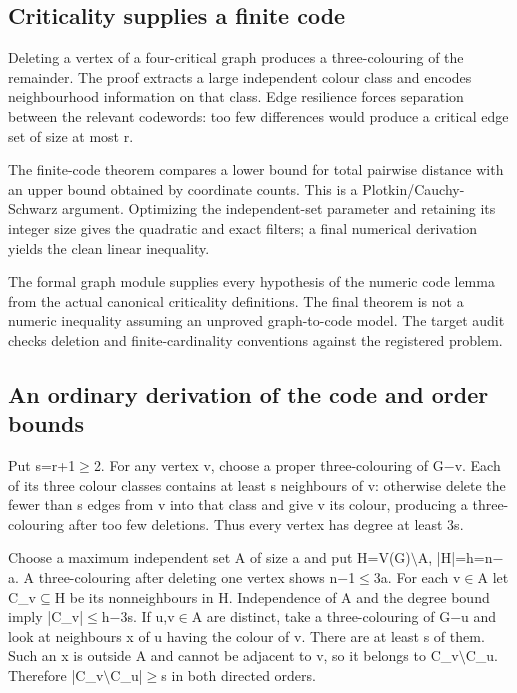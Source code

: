 \documentclass[11pt,a4paper]{article}
\begin{document}
\subsection{Criticality supplies a finite code}
Deleting a vertex of a four-critical graph produces a three-colouring of the remainder. The proof extracts a large independent colour class and encodes neighbourhood information on that class. Edge resilience forces separation between the relevant codewords: too few differences would produce a critical edge set of size at most r.

The finite-code theorem compares a lower bound for total pairwise distance with an upper bound obtained by coordinate counts. This is a Plotkin/Cauchy-Schwarz argument. Optimizing the independent-set parameter and retaining its integer size gives the quadratic and exact filters; a final numerical derivation yields the clean linear inequality.

The formal graph module supplies every hypothesis of the numeric code lemma from the actual canonical criticality definitions. The final theorem is not a numeric inequality assuming an unproved graph-to-code model. The target audit checks deletion and finite-cardinality conventions against the registered problem.

\subsection{An ordinary derivation of the code and order bounds}
Put s=r+1\ensuremath{\geq}2. For any vertex v, choose a proper three-colouring of G\ensuremath{-}v. Each of its three colour classes contains at least s neighbours of v: otherwise delete the fewer than s edges from v into that class and give v its colour, producing a three-colouring after too few deletions. Thus every vertex has degree at least 3s.

Choose a maximum independent set A of size a and put H=V(G)\ensuremath{\setminus}A, |H|=h=n\ensuremath{-}a. A three-colouring after deleting one vertex shows n\ensuremath{-}1\ensuremath{\leq}3a. For each v\ensuremath{\in}A let C\_v\ensuremath{\subseteq}H be its nonneighbours in H. Independence of A and the degree bound imply |C\_v|\ensuremath{\leq}h\ensuremath{-}3s. If u,v\ensuremath{\in}A are distinct, take a three-colouring of G\ensuremath{-}u and look at neighbours x of u having the colour of v. There are at least s of them. Such an x is outside A and cannot be adjacent to v, so it belongs to C\_v\ensuremath{\setminus}C\_u. Therefore |C\_v\ensuremath{\setminus}C\_u|\ensuremath{\geq}s in both directed orders.
\end{document}

